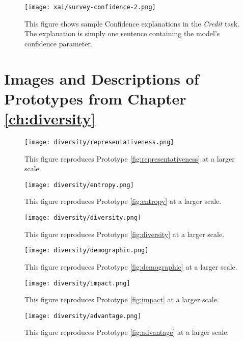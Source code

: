 \begin{figure}[!hbtp]
    \centering
    \texttt{[image: xai/survey-confidence-2.png]}
    \caption{This figure shows sample Confidence explanations in the \emph{Credit} task. The explanation is simply one sentence containing the model's confidence parameter.}
    \label{fig:confidencecreditfull}
\end{figure}

\newpage
\section{Images and Descriptions of Prototypes from Chapter \ref{ch:diversity}}\label{app:divfigures}

\begin{figure}[!hbtp]
    \centering
    \texttt{[image: diversity/representativeness.png]}
    \caption{This figure reproduces Prototype \ref{fig:representativeness} at a larger scale.}
    \label{fig:representativeness_full}
\end{figure}

\begin{figure}[!hbtp]
    \centering
    \texttt{[image: diversity/entropy.png]}
    \caption{This figure reproduces Prototype \ref{fig:entropy} at a larger scale.}
    \label{fig:entropy_full}
\end{figure}

\begin{figure}[!hbtp]
    \centering
    \texttt{[image: diversity/diversity.png]}
    \caption{This figure reproduces Prototype \ref{fig:diversity} at a larger scale.}
    \label{fig:diversity_full}
\end{figure}

\begin{figure}[!hbtp]
    \centering
    \texttt{[image: diversity/demographic.png]}
    \caption{This figure reproduces Prototype \ref{fig:demographic} at a larger scale.}
    \label{fig:demographic_full}
\end{figure}

\begin{figure}[!hbtp]
    \centering
    \texttt{[image: diversity/impact.png]}
    \caption{This figure reproduces Prototype \ref{fig:impact} at a larger scale.}
    \label{fig:impact_full}
\end{figure}

\begin{figure}[!hbtp]
    \centering
    \texttt{[image: diversity/advantage.png]}
    \caption{This figure reproduces Prototype \ref{fig:advantage} at a larger scale.}
    \label{fig:advantage_full}
\end{figure}

